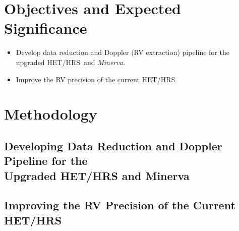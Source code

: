 \documentclass[12pt]{article}
\def\minerva{{\it Minerva}}
\def\hrs{HET/HRS}
\begin{document}

\section{Objectives and Expected Significance}



\begin{itemize}[leftmargin=2.2em]
    \vspace{-3pt}
\item Develop data reduction and Doppler (RV extraction) pipeline
  for the upgraded \hrs\ and \minerva.
    \vspace{-3pt}
\end{itemize}


\begin{itemize}[leftmargin=2.2em]
  \vspace{-3pt}
\item Improve the RV precision of the current \hrs.
  \vspace{-3pt}
\end{itemize}




\vspace{-3pt}
\section{Methodology}


\vspace{-3pt}
\subsection{Developing Data Reduction and Doppler Pipeline for the \\
  Upgraded HET/HRS and Minerva}\label{develop} 

\vspace{-3pt}
\subsection{Improving the RV Precision of the Current HET/HRS}
\end{document}
